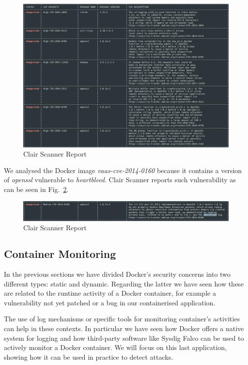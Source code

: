 \documentclass[a4paper,12pt]{article}
\def\myfig#1{Fig.~#1\xspace}
\begin{document}
\begin{figure}[ht!]
  \centerline{\includegraphics[width=1\textwidth]{clair_report.png}}
  \caption{Clair Scanner Report}
  \label{fig:clair_report}
  \end{figure}

We analysed the Docker image \textit{vaas-cve-2014-0160} because it contains a
version of \textit{openssl} vulnerable to \textit{heartbleed}. Clair Scanner
reports such vulnerability as can be seen in \myfig{\ref{fig:clair_heartbleed}}.

  \begin{figure}[ht!]
    \centerline{\includegraphics[width=1\textwidth]{clair_heartbleed.png}}
    \caption{Clair Scanner Report}
    \label{fig:clair_heartbleed}
    \end{figure}

\subsection{Container Monitoring}

In the previous sections we have divided Docker's security concerns into two
different types: static and dynamic. Regarding the latter we have seen how these
are related to the runtime activity of a Docker container, for example a
vulnerability not yet patched or a bug in our containerised application. \par
The use of log mechanisms or specific tools for monitoring container's
activities can help in these contexts. In particular we have seen how Docker
offers a native system for logging and how third-party software like Sysdig
Falco can be used to actively monitor a Docker container. We will focus on this
last application, showing how it can be used in practice to detect attacks. 
\end{document}
